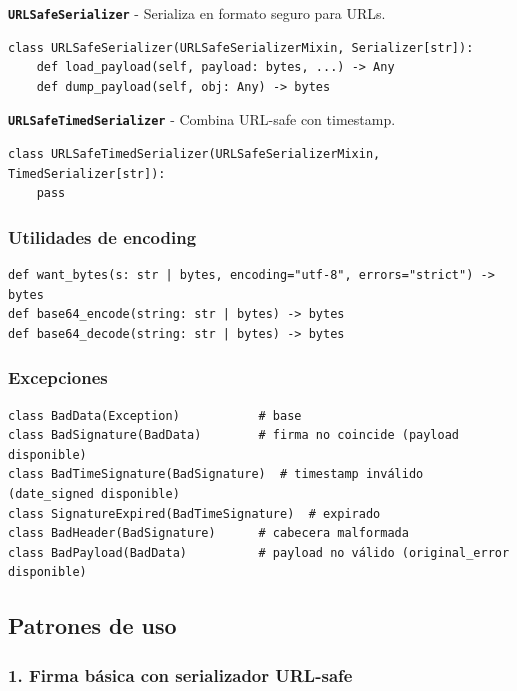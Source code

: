 \documentclass[11pt,a4paper]{article}
\begin{document}
\textbf{\texttt{URLSafeSerializer}} - Serializa en formato seguro para URLs.


\begin{lstlisting}
class URLSafeSerializer(URLSafeSerializerMixin, Serializer[str]):
    def load_payload(self, payload: bytes, ...) -> Any
    def dump_payload(self, obj: Any) -> bytes
\end{lstlisting}


\textbf{\texttt{URLSafeTimedSerializer}} - Combina URL-safe con timestamp.


\begin{lstlisting}
class URLSafeTimedSerializer(URLSafeSerializerMixin, TimedSerializer[str]):
    pass
\end{lstlisting}


\subsubsection*{Utilidades de encoding}


\begin{lstlisting}
def want_bytes(s: str | bytes, encoding="utf-8", errors="strict") -> bytes
def base64_encode(string: str | bytes) -> bytes
def base64_decode(string: str | bytes) -> bytes
\end{lstlisting}


\subsubsection*{Excepciones}


\begin{lstlisting}
class BadData(Exception)           # base
class BadSignature(BadData)        # firma no coincide (payload disponible)
class BadTimeSignature(BadSignature)  # timestamp inválido (date_signed disponible)
class SignatureExpired(BadTimeSignature)  # expirado
class BadHeader(BadSignature)      # cabecera malformada
class BadPayload(BadData)          # payload no válido (original_error disponible)
\end{lstlisting}


\subsection*{Patrones de uso}


\subsubsection*{1. Firma básica con serializador URL-safe}
\end{document}

